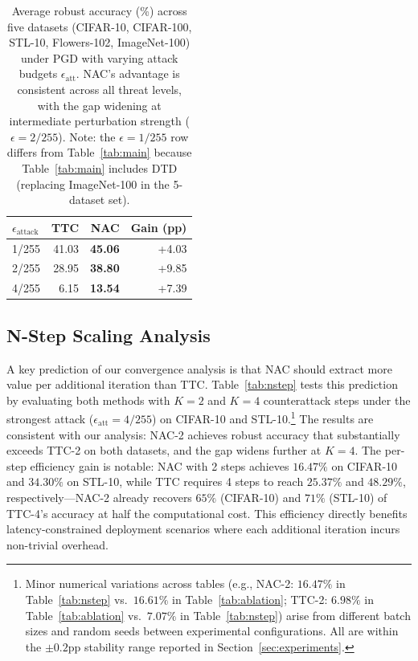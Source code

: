 \documentclass[12pt,a4paper]{article}
\begin{document}
\begin{table}[ht]\centering\small
\caption{Average robust accuracy (\%) across five datasets (CIFAR-10, CIFAR-100, STL-10, Flowers-102, ImageNet-100) under PGD with varying attack budgets $\epsilon_{\text{att}}$. NAC's advantage is consistent across all threat levels, with the gap widening at intermediate perturbation strength ($\epsilon=2/255$). Note: the $\epsilon{=}1/255$ row differs from Table~\ref{tab:main} because Table~\ref{tab:main} includes DTD (replacing ImageNet-100 in the 5-dataset set).}\label{tab:multi}
\begin{tabular}{@{}lrrr@{}}
\toprule $\epsilon_{\text{attack}}$ & TTC & NAC & Gain (pp) \\
\midrule 1/255 & 41.03 & \textbf{45.06} & +4.03 \\
2/255 & 28.95 & \textbf{38.80} & +9.85 \\
4/255 & 6.15 & \textbf{13.54} & +7.39 \\
\bottomrule
\end{tabular}
\end{table}

\subsection{N-Step Scaling Analysis}

A key prediction of our convergence analysis is that NAC should extract more value per additional iteration than TTC. Table~\ref{tab:nstep} tests this prediction by evaluating both methods with $K=2$ and $K=4$ counterattack steps under the strongest attack ($\epsilon_{\text{att}}=4/255$) on CIFAR-10 and STL-10.\footnote{Minor numerical variations across tables (e.g., NAC-2: $16.47\%$ in Table~\ref{tab:nstep} vs.\ $16.61\%$ in Table~\ref{tab:ablation}; TTC-2: $6.98\%$ in Table~\ref{tab:ablation} vs.\ $7.07\%$ in Table~\ref{tab:nstep}) arise from different batch sizes and random seeds between experimental configurations. All are within the $\pm 0.2$pp stability range reported in Section~\ref{sec:experiments}.} The results are consistent with our analysis: NAC-2 achieves robust accuracy that substantially exceeds TTC-2 on both datasets, and the gap widens further at $K=4$. The per-step efficiency gain is notable: NAC with 2 steps achieves $16.47\%$ on CIFAR-10 and $34.30\%$ on STL-10, while TTC requires 4 steps to reach $25.37\%$ and $48.29\%$, respectively---NAC-2 already recovers $65\%$ (CIFAR-10) and $71\%$ (STL-10) of TTC-4's accuracy at half the computational cost. This efficiency directly benefits latency-constrained deployment scenarios where each additional iteration incurs non-trivial overhead.
\end{document}
